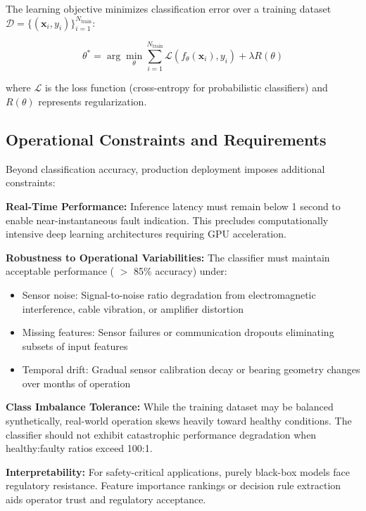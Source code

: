 \documentclass[11pt,a4paper]{article}
\begin{document}
The learning objective minimizes classification error over a training dataset $\mathcal{D} = \{(\mathbf{x}_i, y_i)\}_{i=1}^{N_{\text{train}}}$:

\begin{equation}
\theta^* = \arg\min_\theta \sum_{i=1}^{N_{\text{train}}} \mathcal{L}(f_\theta(\mathbf{x}_i), y_i) + \lambda R(\theta)
\end{equation}

where $\mathcal{L}$ is the loss function (cross-entropy for probabilistic classifiers) and $R(\theta)$ represents regularization.

\subsection{Operational Constraints and Requirements}

Beyond classification accuracy, production deployment imposes additional constraints:

\textbf{Real-Time Performance:} Inference latency must remain below 1 second to enable near-instantaneous fault indication. This precludes computationally intensive deep learning architectures requiring GPU acceleration.

\textbf{Robustness to Operational Variabilities:} The classifier must maintain acceptable performance ( $>$ 85\% accuracy) under:
\begin{itemize}[itemsep=0.2em]
    \item Sensor noise: Signal-to-noise ratio degradation from electromagnetic interference, cable vibration, or amplifier distortion
    \item Missing features: Sensor failures or communication dropouts eliminating subsets of input features
    \item Temporal drift: Gradual sensor calibration decay or bearing geometry changes over months of operation
\end{itemize}

\textbf{Class Imbalance Tolerance:} While the training dataset may be balanced synthetically, real-world operation skews heavily toward healthy conditions. The classifier should not exhibit catastrophic performance degradation when healthy:faulty ratios exceed 100:1.

\textbf{Interpretability:} For safety-critical applications, purely black-box models face regulatory resistance. Feature importance rankings or decision rule extraction aids operator trust and regulatory acceptance.
\end{document}
